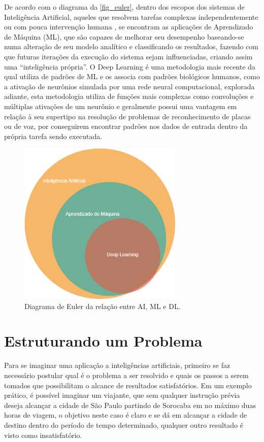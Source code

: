 De acordo com o diagrama da \autoref{fig_euler}, dentro dos escopos dos sistemas
de Inteligência Artificial, aqueles que resolvem tarefas complexas
independentemente ou com pouca intervenção humana \cite{russel2020},
se encontram as aplicações de Aprendizado de Máquina (ML), que são
capazes de melhorar seu desempenho baseando-se numa alteração de seu
modelo analítico e classificando os resultados, fazendo com que
futuras iterações da execução do sistema sejam influenciadas, criando
assim uma “inteligência própria”. O Deep Learning é uma metodologia
mais recente da qual utiliza de padrões de ML e os associa com padrões
biológicos humanos, como a ativação de neurônios simulada por uma rede
neural computacional, explorada adiante, esta metodologia utiliza de
funções mais complexas como convoluções e múltiplas ativações de um
neurônio \cite{janiesch2021} e geralmente possui uma vantagem em
relação à seu supertipo na resolução de problemas de reconhecimento de
placas ou de voz, por conseguirem encontrar padrões nos dados de
entrada dentro da própria tarefa sendo executada.

\begin{figure}[htb]
  \centering
  \caption{\label{fig_euler}Diagrama de Euler da rela{\c c}{\~a}o entre AI, ML e DL.}
  \includegraphics[width=0.7\textwidth]{images/ai-euler.png}
\end{figure}

\section{Estruturando um Problema}

Para se imaginar uma aplicação a inteligências artificiais, primeiro
se faz necessário postular qual é o problema a ser resolvido e quais
os passos a serem tomados que possibilitam o alcance de resultados
satisfatórios. Em um exemplo prático, é possível imaginar um viajante,
que sem qualquer instrução prévia deseja alcançar a cidade de São
Paulo partindo de Sorocaba em no máximo duas horas de viagem, o
objetivo neste caso é claro e se dá em alcançar a cidade de destino
dentro do período de tempo determinado, qualquer outro resultado é
visto como insatisfatório.

